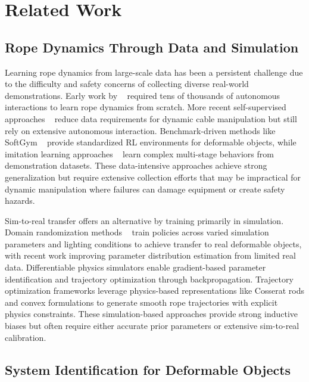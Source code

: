 \documentclass[conference]{IEEEtran}
\begin{document}
\section{Related Work}

\subsection{Rope Dynamics Through Data and Simulation}

Learning rope dynamics from large-scale data has been a persistent challenge due to the difficulty and safety concerns of collecting diverse real-world demonstrations. Early work by ~\citet{nair_combining_2017} required tens of thousands of autonomous interactions to learn rope dynamics from scratch. More recent self-supervised approaches ~\cite{wang2024selfsupervisedlearningdynamicplanar} reduce data requirements for dynamic cable manipulation but still rely on extensive autonomous interaction. Benchmark-driven methods like SoftGym ~\cite{lin2020softgym} provide standardized RL environments for deformable objects, while imitation learning approaches ~\cite{zhao2023learning, luo2024multistage} learn complex multi-stage behaviors from demonstration datasets. These data-intensive approaches achieve strong generalization but require extensive collection efforts that may be impractical for dynamic manipulation where failures can damage equipment or create safety hazards.

Sim-to-real transfer offers an alternative by training primarily in simulation. Domain randomization methods ~\cite{matas_simreal_2018, tiboni2023dropo} train policies across varied simulation parameters and lighting conditions to achieve transfer to real deformable objects, with recent work improving parameter distribution estimation from limited real data. Differentiable physics simulators \cite{hu2019chainqueen, jatavallabhula2021gradsim, chen2024deform, si2024difftactile} enable gradient-based parameter identification and trajectory optimization through backpropagation. Trajectory optimization frameworks \cite{jnadi2026scope, artinian2024optimal, yamakawa_simple_2012, yamakawa_dynamic_2013} leverage physics-based representations like Cosserat rods and convex formulations to generate smooth rope trajectories with explicit physics constraints. These simulation-based approaches provide strong inductive biases but often require either accurate prior parameters or extensive sim-to-real calibration.

\subsection{System Identification for Deformable Objects}
\end{document}
